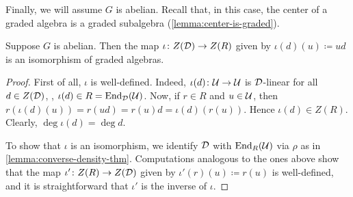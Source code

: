 Finally, we will assume $G$ is abelian. 
Recall that, in this case, the center of a graded algebra is a graded subalgebra (\cref{lemma:center-is-graded}). 

\begin{prop}\label{prop:R-and-D-have-the-same-center}
    Suppose $G$ is abelian. 
    Then the map $\iota\colon Z(\mathcal{D}) \to Z(R)$ given by $\iota (d)(u) \coloneqq ud$ is an isomorphism of graded algebras.
\end{prop}

\begin{proof}
    First of all, $\iota$ is well-defined. 
    Indeed, $\iota(d)\colon \mathcal U \to \mathcal U$ is $\mathcal{D}$-linear for all $d\in Z(\mathcal{D})$, \ie, $\iota(d) \in R = \operatorname{End}_{\mathcal{D}}(\mathcal U)$. 
    Now, if $r\in R$ and $u \in \mathcal U$, then $r (\iota(d)(u)) = r(ud) = r(u) d = \iota(d) (r(u))$. 
    Hence $\iota(d) \in Z(R)$. 
    Clearly, $\deg \iota(d) = \deg d$. 
    
    To show that $\iota$ is an isomorphism, we identify $\mathcal{D}$ with $\operatorname{End}_R (\mathcal U)$ via $\rho$ as in \cref{lemma:converse-density-thm}. 
    Computations analogous to the ones above show that the map $\iota'\colon Z(R) \to Z(\mathcal{D})$ given by $\iota'(r)(u) \coloneqq r(u)$ is well-defined, and it is straightforward that $\iota'$ is the inverse of $\iota$. 
\end{proof}






